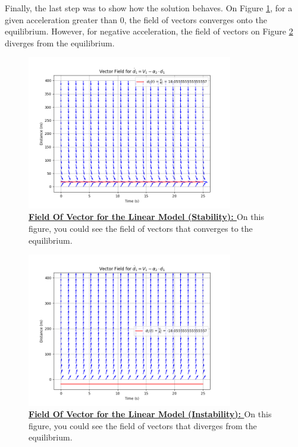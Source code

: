 \documentclass{article}
\begin{document}
		Finally, the last step was to show how the solution behaves. On Figure \ref{fig:FV1}, for a given acceleration greater than 0, the field of vectors converges onto the equilibrium. However, for negative acceleration, the field of vectors on Figure \ref{fig:FV2} diverges from the equilibrium.
		
		\begin{figure}[H]
			\centering
			\includegraphics[width=0.8\textwidth]{FieldOfVector_CV.png}
			\caption{\textbf{\underline{Field Of Vector for the Linear Model (Stability): }} On this figure, you could see the field of vectors that converges to the equilibrium.}
			\label{fig:FV1}
		\end{figure}
		
		\begin{figure}[H]
			\centering
			\includegraphics[width=0.8\textwidth]{FieldOfVector_DV.png}
			\caption{\textbf{\underline{Field Of Vector for the Linear Model (Instability): }} On this figure, you could see the field of vectors that diverges from the equilibrium.}
			\label{fig:FV2}
		\end{figure}
		
\end{document}
